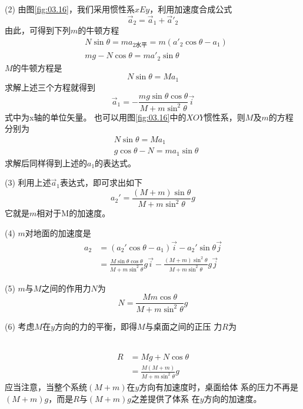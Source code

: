 (2) 由图\ref{fig:03.16}，我们采用惯性系$ xEy $，利用加速度合成公式
\begin{equation*}
  \vec{a} _ { 2 } = \vec{a} _ { 1 } + \vec{a}' _ 2
\end{equation*}
由此，可得到下列$ m $的牛顿方程
\begin{align*}
   & N \sin \theta = m a _ { 2\text{水平} }  = m \left( a '_2 \cos \theta - a _ { 1 } \right) \\
   & m g - N \cos \theta = m a' _ { 2 } \sin \theta
\end{align*}
$ M $的牛顿方程是
\begin{equation*}
  N \sin \theta = M a _ { 1 }
\end{equation*}
求解上述三个方程就得到
\begin{equation*}
  \vec{a} _ { 1 } = - \frac { m g \sin \theta \cos \theta} { M + m \sin ^ { 2 } \theta } \vec{i}
\end{equation*}式中为x轴的单位矢量。
也可以用图\ref{fig:03.16}\;中的$ XOY $惯性系，则$ M $及$ m $的方程分别为
\begin{align*}
   & N \sin \theta = M a _ { 1 }                 \\
   & g \cos \theta - N = m a _ { 1 } \sin \theta
\end{align*}
求解后同样得到上述的$ a_1 $的表达式。

(3) 利用上述$\vec{a}_1$表达式，即可求出如下
\begin{equation*}
  a _ 2 ' = \frac { \left( M + m \right) \sin \theta } { M + m \sin ^ { 2 } \theta } g
\end{equation*}
它就是$ m $相对于M的加速度。

(4) $ m $对地面的加速度是
\begin{align*}
  a _ { 2 } & = \left( a _ { 2 }' \cos \theta - a _ { 1 } \right) \vec{i} - a _ 2 ' \sin \theta \vec{j}                                                                                  \\
            & = \frac { M \sin \theta \cos \theta } { M + m \sin ^ { 2 } \theta } g \vec{i} - \frac { \left( M + m \right) \sin ^ { 2 } \theta } { M + m \sin ^ { 2 } \theta } g \vec{j}
\end{align*}

(5) $ m $与$ M $之间的作用力$ N $为
\begin{equation*}
  N = \frac { M  m \cos \theta } { M + m \sin ^ { 2 } \theta } g
\end{equation*}

(6) 考虑$ M $在$ y $方向的力的平衡，即得$ M $与桌面之间的正压
力$ R $为

~\vspace{-1.56em}
\begin{align*}
  R & = M g + N \cos \theta                                              \\
    & = \frac { M \left( M + m \right) } { M + m \sin ^ { 2 } \theta } g
\end{align*}
应当注意，当整个系统$  \left( M + m \right)  $在$ y $方向有加速度时，桌面给体
系的压力不再是$  \left( M + m \right) g  $，而是$ R $与$  \left( M + m \right) g  $之差提供了体系
在$ y $方向的加速度。